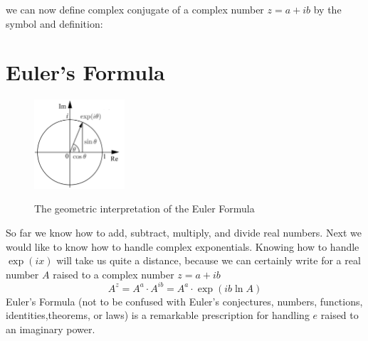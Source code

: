 \documentclass[12pt]{article}
\begin{document}
we can now define complex conjugate of a complex number $z = a+ib$ by the symbol and definition:


\section{Euler's Formula}

\begin{figure}[thb]
\begin{center}
{\includegraphics[width=0.30\textwidth]{figs/euler.pdf}}
\end{center}
\caption{\label{fig:euler} The geometric interpretation of the Euler Formula }
\end{figure}

So far we know how to add, subtract, multiply, and divide real numbers.   Next we would like to know how to handle complex exponentials.  Knowing how to handle $\exp(ix)$ will take us quite a distance, because we can certainly write for a real number $A$ raised to a complex number $z=a + ib$
\begin{equation*}
A^z = A^a \cdot A^{ib} = A^a \cdot \exp(ib\ln A)
\end{equation*}
Euler's Formula (not to be confused with Euler's conjectures, numbers, functions, identities,theorems, or laws) is a remarkable prescription for handling $e$ raised to an imaginary power. 
\end{document}
